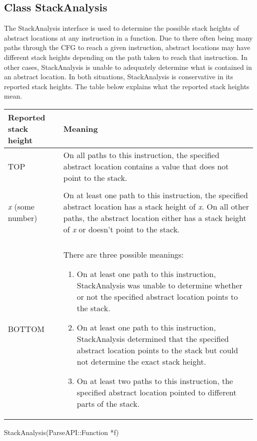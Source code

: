 \subsection{Class StackAnalysis}
\label{sec:stackanalysis}

The StackAnalysis interface is used to determine the possible stack heights of abstract locations at any instruction in a function.  Due to there often being many paths through the CFG to reach a given instruction, abstract locations may have different stack heights depending on the path taken to reach that instruction.  In other cases, StackAnalysis is unable to adequately determine what is contained in an abstract location.  In both situations, StackAnalysis is conservative in its reported stack heights.  The table below explains what the reported stack heights mean.

\begin{tabular}{p{1.25in}p{4.25in}}
	\toprule
	Reported stack height & Meaning \\
	\midrule
	TOP & On all paths to this instruction, the specified abstract location contains a value that does not point to the stack. \\\\
	\emph{x} (some number) & On at least one path to this instruction, the specified abstract location has a stack height of \emph{x}.  On all other paths, the abstract location either has a stack height of \emph{x} or doesn't point to the stack. \\\\
	BOTTOM & There are three possible meanings:
	  \begin{enumerate}
		\item On at least one path to this instruction, StackAnalysis was unable to determine whether or not the specified abstract location points to the stack.
		\item On at least one path to this instruction, StackAnalysis determined that the specified abstract location points to the stack but could not determine the exact stack height.
		\item On at least two paths to this instruction, the specified abstract location pointed to different parts of the stack.
	  \end{enumerate} \\
	\bottomrule
\end{tabular}

\begin{apient}
	StackAnalysis(ParseAPI::Function *f)
\end{apient}

